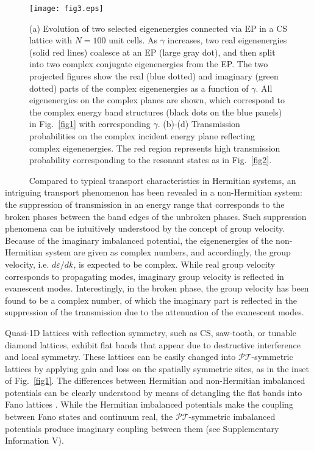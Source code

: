 \documentclass[report,epsfig,pre]{revtex4}
\begin{document}
\begin{figure}
\centering
\texttt{[image: fig3.eps]}
\caption{(a) Evolution of two selected eigenenergies connected via EP in a CS lattice with $N=100$ unit cells. As $\gamma$ increases, two real eigenenergies (solid red lines) coalesce at an EP (large gray dot), and then split into two complex conjugate eigenenergies from the EP. The two projected figures show the real (blue dotted) and imaginary (green dotted) parts of the complex eigenenergies as a function of $\gamma$. All eigenenergies on the complex planes are shown, which correspond to the complex energy band structures (black dots on the blue panels) in Fig.~\ref{fig1} with corresponding $\gamma$.
(b)-(d) Transmission probabilities on the complex incident energy plane reflecting complex eigenenergies. The red region represents high transmission probability corresponding to the resonant states as in Fig.~\ref{fig2}.
}
\label{fig3}
\end{figure}

~~~~~ Compared to typical transport characteristics in Hermitian systems, an intriguing transport phenomenon has been revealed in a non-Hermitian system: the suppression of transmission in an energy range that corresponds to the broken phases between the band edges of the unbroken phases. Such suppression phenomena can be intuitively understood by the concept of group velocity. Because of the imaginary imbalanced potential, the eigenenergies of the non-Hermitian system are given as complex numbers, and accordingly, the group velocity, i.e. $d\varepsilon/dk$, is expected to be complex. While real group velocity corresponds to propagating modes, imaginary group velocity is reflected in evanescent modes. Interestingly, in the broken phase, the group velocity has been found to be a complex number, of which the imaginary part is reflected in the suppression of the transmission due to the attenuation of the evanescent modes.

Quasi-1D lattices with reflection symmetry, such as CS, saw-tooth, or tunable diamond lattices, exhibit flat bands that appear due to destructive interference and local symmetry. These lattices can be easily changed into $\mathcal{PT}$-symmetric lattices by applying gain and loss on the spatially symmetric sites, as in the inset of Fig.~\ref{fig1}. The differences between Hermitian and non-Hermitian imbalanced potentials can be clearly understood by means of detangling the flat bands into Fano lattices \cite{Fla14}. While the Hermitian imbalanced potentials make the coupling between Fano states and continuum real, the $\mathcal{PT}$-symmetric imbalanced potentials produce imaginary coupling between them (see Supplementary Information V).
\end{document}
